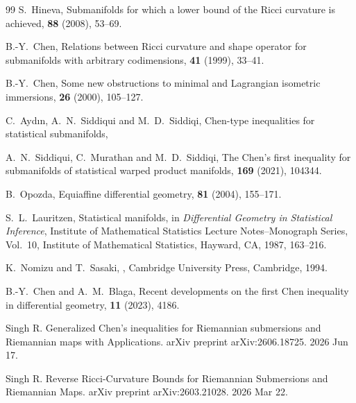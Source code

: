 \documentclass[10pt,a4paper]{article}
\theoremstyle{definition}
\theoremstyle{remark}
\numberwithin{equation}{section}
\begin{document}
\begin{thebibliography}{99}
S.~Hineva,
\newblock Submanifolds for which a lower bound of the Ricci curvature is
achieved,
 {\bf 88} (2008), 53--69.

B.-Y.~Chen,
\newblock Relations between Ricci curvature and shape operator for
submanifolds with arbitrary codimensions,
 {\bf 41} (1999), 33--41.

B.-Y.~Chen,
\newblock Some new obstructions to minimal and Lagrangian isometric
immersions,
 {\bf 26} (2000), 105--127.

C.~Ayd{\i}n, A.~N.~Siddiqui and M.~D.~Siddiqi,
\newblock Chen-type inequalities for statistical submanifolds,
\newblock %

A.~N.~Siddiqui, C.~Murathan and M.~D.~Siddiqi,
\newblock The Chen's first inequality for submanifolds of statistical warped
product manifolds,
 {\bf 169} (2021),
104344.

B.~Opozda,
\newblock Equiaffine differential geometry,
 {\bf 81} (2004), 155--171.

S.~L.~Lauritzen,
\newblock Statistical manifolds,
\newblock in {\it Differential Geometry in Statistical Inference},
Institute of Mathematical Statistics Lecture Notes--Monograph Series,
Vol.~10, Institute of Mathematical Statistics, Hayward, CA, 1987,
163--216.

K.~Nomizu and T.~Sasaki,
,
\newblock Cambridge University Press, Cambridge, 1994.

B.-Y.~Chen and A.~M.~Blaga,
\newblock Recent developments on the first Chen inequality in differential
geometry,
 {\bf 11} (2023), 4186.

 Singh R. Generalized Chen's inequalities for Riemannian submersions and Riemannian maps with Applications. arXiv preprint arXiv:2606.18725. 2026 Jun 17.

 Singh R. Reverse Ricci-Curvature Bounds for Riemannian Submersions and Riemannian Maps. arXiv preprint arXiv:2603.21028. 2026 Mar 22.


\end{thebibliography}
\end{document}
